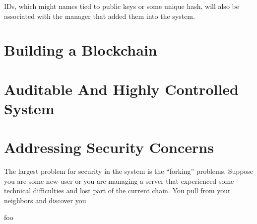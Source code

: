 \documentclass[11pt,letterpaper]{article}
\begin{document}
	IDs, which might names tied to public keys or some unique hash, will also be associated with the manager that added them into the system.
	
	
	
	\section{Building a Blockchain}
	
	
	
	
	
	
	
	\section{Auditable And Highly Controlled System}
	
	
	
	
	\section{Addressing Security Concerns}
	The largest problem for security in the system is the ``forking'' problems.
	Suppose you are some new user or you are managing a server that experienced some technical difficulties and lost part of the current chain.
	You pull from your neighbors and discover you
	
	foo \cite{camilleri2010playing}
	 \cite{tezos}
	
	
\end{document}
